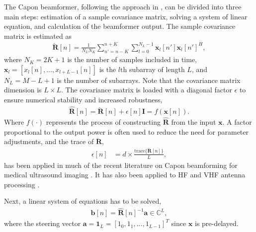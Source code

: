 \documentclass[journal]{IEEEtran}
\newcommand{\mat}[1]{\mathbf{#1}}
\renewcommand{\vec}[1]{\mathbf{#1}}
\begin{document}
The Capon beamformer, following the approach in \cite{Synnevag2009}, can be divided into three main steps: estimation of a sample covariance matrix, solving a system of linear equation, and calculation of the beamformer output.  The sample covariance matrix is estimated as 
\begin{align}
\mat{\breve{R}}[n] = \frac{1}{N_LN_K}\sum_{n'=n-K}^{n+K} \sum_{l=0}^{N_L-1} \vec{x}_l[n']\vec{x}_l[n']^H,\label{eq:R}
\end{align}
where  $N_K = 2K + 1$ is the number of samples included in time, $\vec{x}_l = [x_l[n], \dotso, x_{l+L-1}[n]]$ is the $l\text{th}$ subarray of length $L$, and $N_L = M-L+1$ is the number of subarrays. Note that the covariance matrix dimension is $L \times L$. The covariance matrix is loaded with a diagonal factor $\epsilon$ to ensure numerical stability and increased robustness, 
\begin{align}\label{eq:diag}
\mat{\hat{R}}[n] = \mat{\breve{R}}[n] + \epsilon[n]\mat{I} = f(\vec{x}[n]).
\end{align}
Where $f(\cdot)$ represents the process of constructing $\mat{\hat{R}}$ from the input $\vec{x}$.
A factor proportional to the output power is often used to reduce the need for parameter adjustments, and the trace of $\mat{\breve{R}}$, 
\begin{align}\label{eq:diag_adapt}
\epsilon[n] &= d \times \frac{\text{trace}\{\mat{\breve{R}}[n]\}}{L},
\end{align}
has been applied in much of the recent literature on Capon beamforming for medical ultrasound imaging \cite{Synnevag2007, Nilsen2009, Wang2009, Mehdizadeh2012}. It has also been applied to HF and VHF antenna processing \cite{Featherstone1997b}.

Next, a linear system of equations has to be solved,
\begin{align}\label{eq:b}
\vec{b}[n] = \mat{\hat{R}}[n]^{-1}\vec{a} \in \mathbb{C}^L,
\end{align}
where the steering vector $\vec{a} = \vec{1}_L = [1_0, 1_1, ..., 1_{L-1}]^T$ since $\vec{x}$ is pre-delayed. 
\end{document}
